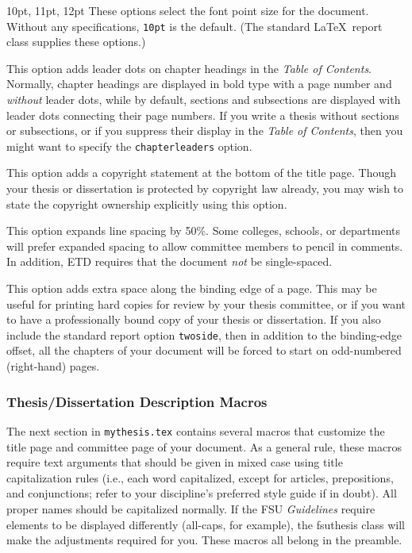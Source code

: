 \documentclass[11pt,letterpaper]{ltxdockit}[2011/03/25]
\newcommand*{\booktitle}[1]{\textit{#1}}
\newcommand*{\complit}[1]{\texttt{#1}}
\newcommand*{\pkg}[1]{\textsf{#1}}
\newcommand*{\fsuth}{\pkg{fsuthesis}}
\renewcommand{\-}{\discretionary{}{}{}}
\newenvironment*{macrolist}
  {\list{}{%
      \setlength{\labelwidth}{1.5in}
      \setlength{\labelsep}{10pt}
      \setlength{\leftmargin}{0pt}
      \setlength{\parsep}{0pt}
      \setlength{\listparindent}{\parindent}
      \renewcommand*{\makelabel}[1]{{\setbox0=\hbox{\parbox[t]{1.5in}{\raggedleft\leavevmode\marglistfont##1}}\dp0=0pt\box0}}}}
  {\endlist}
\def\plainitem#1{#1\\}
\def\optionitems#1{\item[\listofitems{\plainitem}{#1}]}
\begin{document}
\begin{macrolist}
\item[10pt, 11pt, 12pt] These options select the font point size for
  the document.  Without any
  specifications, \complit{10pt} is the default.  (The standard
  \LaTeX\ \pkg{report} class supplies these options.)

\optionitems{chapterleaders}
This option adds leader dots on chapter headings in the \textsl{Table
  of Contents}.
%
%
Normally, chapter headings are displayed in bold type with a page
number and \emph{without} leader dots, while by default, sections and
subsections are displayed with leader dots connecting their page
numbers.  If you write a thesis without sections or subsections, or if
you suppress their display in the \textsl{Table of Contents}, then you
might want to specify the \complit{chapterleaders} option.

\optionitems{copyright}
This option adds a copyright
statement at the bottom of the title page.  Though your thesis or
dissertation is protected by copyright law already, you may wish to
state the copyright ownership explicitly using this option.

\optionitems{expanded}
This option expands line
spacing by 50\%.
Some colleges, schools, or departments will prefer expanded spacing to
allow committee members to pencil in comments.  In addition, ETD
requires that the document \emph{not} be single-spaced.

\optionitems{hardcopy}
This option adds extra space along the binding edge of a page.  This
may be useful for printing hard copies
for review by your thesis committee, or if you want to have a
professionally bound copy of your thesis or dissertation.  If you also
include the standard \pkg{report} option
\complit{twoside}, then in addition to
the binding-edge offset, all the chapters of your document will be
forced to start on odd-numbered (right-hand) pages.

\end{macrolist}


\subsubsection{Thesis/Dissertation Description Macros}
The next section in \complit{mythesis.tex} contains several macros
that customize the title page and committee page of your document.  As
a general rule, these macros require text arguments that should be
given in mixed case using title capitalization
rules (i.e., each word capitalized, except for articles, prepositions,
and conjunctions; refer to your discipline's preferred style guide if
in doubt).  All proper names should be capitalized normally.  If the
FSU \booktitle{Guidelines} require elements to be displayed
differently (all-caps, for example), the \fsuth{} class will make the
adjustments required for you.  These macros all belong in the
preamble.
\end{document}
